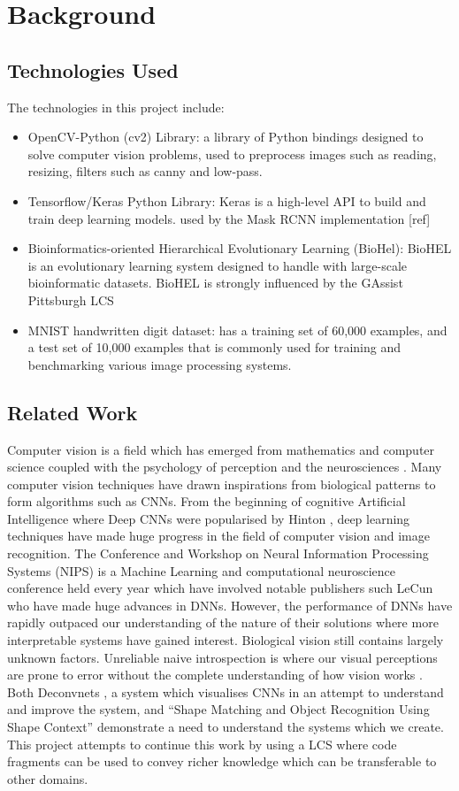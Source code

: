 \chapter{Background}
\section{Technologies Used}
The technologies in this project include:
\begin{itemize}
\item OpenCV-Python (cv2) Library: a library of Python bindings designed to solve computer vision problems, used to preprocess images such as reading, resizing, filters such as canny and low-pass. 
\item Tensorflow/Keras Python Library: Keras is a high-level API to build and train deep learning models. used by the Mask RCNN implementation [ref]
\item Bioinformatics-oriented Hierarchical Evolutionary Learning (BioHel): BioHEL is an evolutionary learning system designed to handle with large-scale bioinformatic datasets. BioHEL is strongly influenced by the GAssist Pittsburgh LCS
\item MNIST handwritten digit dataset: has a training set of 60,000 examples, and a test set of 10,000 examples  that is commonly used for training and benchmarking various image processing systems.
\end{itemize}

\section{Related Work}
Computer vision is a field which has emerged from mathematics and computer science coupled with the psychology of perception and the neurosciences \cite{hartley2003multiple}. Many computer vision techniques have drawn inspirations from biological patterns to form algorithms such as CNNs.  From the beginning of cognitive Artificial Intelligence where Deep CNNs were popularised by Hinton  \cite{krizhevsky2012imagenet}, deep learning techniques have made huge progress in the field of computer vision and image recognition. The Conference and Workshop on Neural Information Processing Systems (NIPS) is a Machine Learning and computational neuroscience conference held every year which have involved notable publishers such LeCun \cite{lecun2015deep} who have made huge advances in DNNs. However, the performance of DNNs have rapidly outpaced our understanding of the nature of their solutions where more interpretable systems have gained interest. Biological vision still contains largely unknown factors. Unreliable naive introspection is where our visual perceptions are prone to error without the complete understanding of how vision works \cite{hartley2003multiple}. Both Deconvnets \cite{zeiler2014visualizing}, a system which visualises CNNs in an attempt to understand and improve the system, and ``Shape Matching and Object Recognition Using Shape Context'' \cite{belongie2002shape} demonstrate a need to understand the systems which we create. This project attempts to continue this work by using a LCS where code fragments can be used to convey richer knowledge which can be transferable to other domains.

